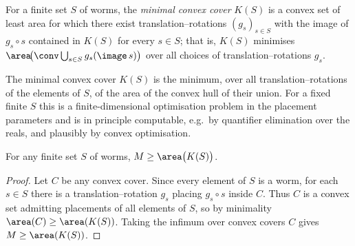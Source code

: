 \begin{definition}
    \label{def:minimalCover}
    For a finite set $S$ of worms, the \emph{minimal convex cover} $K(S)$ is a
    convex set of least area for which there exist translation--rotations
    $(g_s)_{s \in S}$ with the image of $g_s \circ s$ contained in $K(S)$ for
    every $s \in S$; that is, $K(S)$ minimises
    $\area\!\big(\conv \bigcup_{s \in S} g_s(\image\, s)\big)$ over all choices
    of translation--rotations $g_s$.
\end{definition}

\begin{remark}
    \label{rem:computeMinimalCover}
    The minimal convex cover $K(S)$ is the minimum, over all
    translation--rotations of the elements of $S$, of the area of the convex
    hull of their union. For a fixed finite $S$ this is a finite-dimensional
    optimisation problem in the placement parameters and is in principle
    computable, e.g.\ by quantifier elimination over the reals, and plausibly
    by convex optimisation.
\end{remark}

\begin{theorem}
    \label{thm:lowerBound}
    For any finite set $S$ of worms, $M \ge \area\big(K(S)\big)$.
\end{theorem}
\begin{proof}
    Let $C$ be any convex cover. Since every element of $S$ is a worm, for each
    $s \in S$ there is a translation--rotation $g_s$ placing $g_s \circ s$
    inside $C$. Thus $C$ is a convex set admitting placements of all elements of
    $S$, so by minimality $\area(C) \ge \area(K(S))$. Taking the infimum over
    convex covers $C$ gives $M \ge \area(K(S))$.
\end{proof}

